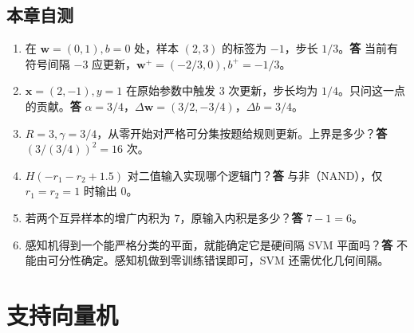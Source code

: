 \documentclass[UTF8,a4paper,zihao=-4,fontset=fandol]{ctexrep}
\begin{document}
\section{本章自测}
\begin{enumerate}[leftmargin=2em]
\item 在 \(\bm w=(0,1),b=0\) 处，样本 \((2,3)\) 的标签为 \(-1\)，步长 \(1/3\)。\textbf{答} 当前有符号间隔 \(-3\) 应更新，\(\bm w^+=(-2/3,0),b^+=-1/3\)。
\item \(\bm x=(2,-1),y=1\) 在原始参数中触发 3 次更新，步长均为 \(1/4\)。只问这一点的贡献。\textbf{答} \(\alpha=3/4\)，\(\Delta\bm w=(3/2,-3/4)\)，\(\Delta b=3/4\)。
\item \(R=3,\gamma=3/4\)，从零开始对严格可分集按题给规则更新。上界是多少？\textbf{答} \((3/(3/4))^2=16\) 次。
\item \(H(-r_1-r_2+1.5)\) 对二值输入实现哪个逻辑门？\textbf{答} 与非（NAND），仅 \(r_1=r_2=1\) 时输出 \(0\)。
\item 若两个互异样本的增广内积为 \(7\)，原输入内积是多少？\textbf{答} \(7-1=6\)。
\item 感知机得到一个能严格分类的平面，就能确定它是硬间隔 SVM 平面吗？\textbf{答} 不能由可分性确定。感知机做到零训练错误即可，SVM 还需优化几何间隔。
\end{enumerate}

\chapter{支持向量机}
\label{ch:prml-svm}
\end{document}
